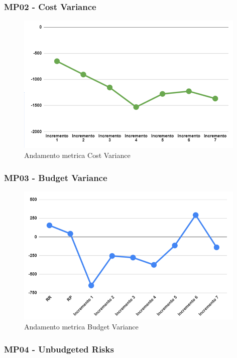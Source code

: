 \subsubsection{MP02 - Cost Variance}

\begin{figure}[H]
	\centering
	\includegraphics[width=11cm]{images/cost_variance.png}
	\caption{Andamento metrica Cost Variance}
\end{figure}

\subsubsection{MP03 - Budget Variance}

\begin{figure}[H]
	\centering
	\includegraphics[width=11cm]{images/budget_variance.png}
	\caption{Andamento metrica Budget Variance}
\end{figure}



\subsubsection{MP04 - Unbudgeted Risks}

